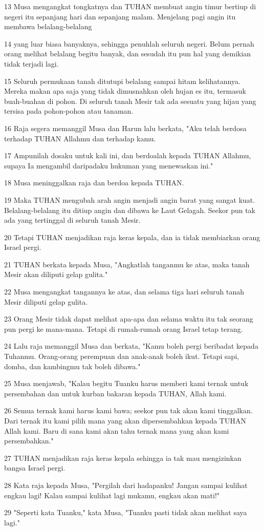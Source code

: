 \par 13 Musa mengangkat tongkatnya dan TUHAN membuat angin timur bertiup di negeri itu sepanjang hari dan sepanjang malam. Menjelang pagi angin itu membawa belalang-belalang
\par 14 yang luar biasa banyaknya, sehingga penuhlah seluruh negeri. Belum pernah orang melihat belalang begitu banyak, dan sesudah itu pun hal yang demikian tidak terjadi lagi.
\par 15 Seluruh permukaan tanah ditutupi belalang sampai hitam kelihatannya. Mereka makan apa saja yang tidak dimusnahkan oleh hujan es itu, termasuk buah-buahan di pohon. Di seluruh tanah Mesir tak ada sesuatu yang hijau yang tersisa pada pohon-pohon atau tanaman.
\par 16 Raja segera memanggil Musa dan Harun lalu berkata, "Aku telah berdosa terhadap TUHAN Allahmu dan terhadap kamu.
\par 17 Ampunilah dosaku untuk kali ini, dan berdoalah kepada TUHAN Allahmu, supaya Ia mengambil daripadaku hukuman yang menewaskan ini."
\par 18 Musa meninggalkan raja dan berdoa kepada TUHAN.
\par 19 Maka TUHAN mengubah arah angin menjadi angin barat yang sangat kuat. Belalang-belalang itu ditiup angin dan dibawa ke Laut Gelagah. Seekor pun tak ada yang tertinggal di seluruh tanah Mesir.
\par 20 Tetapi TUHAN menjadikan raja keras kepala, dan ia tidak membiarkan orang Israel pergi.
\par 21 TUHAN berkata kepada Musa, "Angkatlah tanganmu ke atas, maka tanah Mesir akan diliputi gelap gulita."
\par 22 Musa mengangkat tangannya ke atas, dan selama tiga hari seluruh tanah Mesir diliputi gelap gulita.
\par 23 Orang Mesir tidak dapat melihat apa-apa dan selama waktu itu tak seorang pun pergi ke mana-mana. Tetapi di rumah-rumah orang Israel tetap terang.
\par 24 Lalu raja memanggil Musa dan berkata, "Kamu boleh pergi beribadat kepada Tuhanmu. Orang-orang perempuan dan anak-anak boleh ikut. Tetapi sapi, domba, dan kambingmu tak boleh dibawa."
\par 25 Musa menjawab, "Kalau begitu Tuanku harus memberi kami ternak untuk persembahan dan untuk kurban bakaran kepada TUHAN, Allah kami.
\par 26 Semua ternak kami harus kami bawa; seekor pun tak akan kami tinggalkan. Dari ternak itu kami pilih mana yang akan dipersembahkan kepada TUHAN Allah kami. Baru di sana kami akan tahu ternak mana yang akan kami persembahkan."
\par 27 TUHAN menjadikan raja keras kepala sehingga ia tak mau mengizinkan bangsa Israel pergi.
\par 28 Kata raja kepada Musa, "Pergilah dari hadapanku! Jangan sampai kulihat engkau lagi! Kalau sampai kulihat lagi mukamu, engkau akan mati!"
\par 29 "Seperti kata Tuanku," kata Musa, "Tuanku pasti tidak akan melihat saya lagi."

